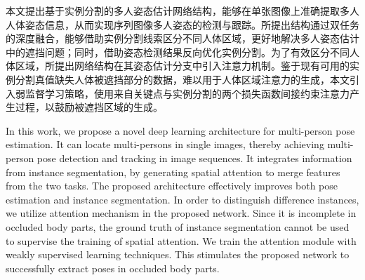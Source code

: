 \begin{cabstractextra}
    本文提出基于实例分割的多人姿态估计网络结构，能够在单张图像上准确提取多人人体姿态信息，从而实现序列图像多人姿态的检测与跟踪。所提出结构通过双任务的深度融合，能够借助实例分割线索区分不同人体区域，更好地解决多人姿态估计中的遮挡问题；同时，借助姿态检测结果反向优化实例分割。为了有效区分不同人体区域，所提出网络结构在其姿态估计分支中引入注意力机制。鉴于现有可用的实例分割真值缺失人体被遮挡部分的数据，难以用于人体区域注意力的生成，本文引入弱监督学习策略，使用来自关键点与实例分割的两个损失函数间接约束注意力产生过程，以鼓励被遮挡区域的生成。
\end{cabstractextra}
\begin{eabstractextra}
    In this work, we propose a novel deep learning architecture for multi-person pose estimation. It can locate multi-persons in single images, thereby achieving multi-person pose detection and tracking in image sequences. It integrates information from instance segmentation, by generating spatial attention to merge features from the two tasks. The proposed architecture effectively improves both pose estimation and instance segmentation. In order to distinguish difference instances, we utilize attention mechanism in the proposed network. Since it is incomplete in occluded body parts, the ground truth of instance segmentation cannot be used to supervise the training of spatial attention. We train the attention module with weakly supervised learning techniques. This stimulates the proposed network to successfully extract poses in occluded body parts.
\end{eabstractextra}
